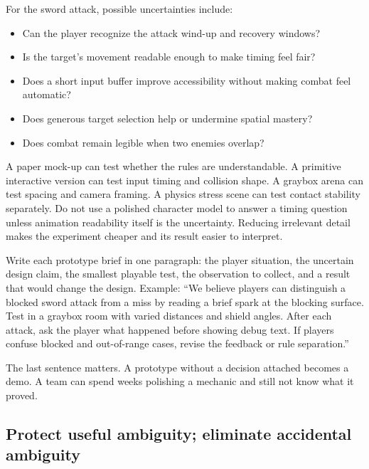 For the sword attack, possible uncertainties include:

\begin{itemize}
\tightlist
\item
  Can the player recognize the attack wind-up and recovery windows?
\item
  Is the target's movement readable enough to make timing feel fair?
\item
  Does a short input buffer improve accessibility without making combat feel automatic?
\item
  Does generous target selection help or undermine spatial mastery?
\item
  Does combat remain legible when two enemies overlap?
\end{itemize}

A paper mock-up can test whether the rules are understandable. A primitive interactive version can test input timing and collision shape. A graybox arena can test spacing and camera framing. A physics stress scene can test contact stability separately. Do not use a polished character model to answer a timing question unless animation readability itself is the uncertainty. Reducing irrelevant detail makes the experiment cheaper and its result easier to interpret.

Write each prototype brief in one paragraph: the player situation, the uncertain design claim, the smallest playable test, the observation to collect, and a result that would change the design. Example: ``We believe players can distinguish a blocked sword attack from a miss by reading a brief spark at the blocking surface. Test in a graybox room with varied distances and shield angles. After each attack, ask the player what happened before showing debug text. If players confuse blocked and out-of-range cases, revise the feedback or rule separation.''

The last sentence matters. A prototype without a decision attached becomes a demo. A team can spend weeks polishing a mechanic and still not know what it proved.

\subsection{Protect useful ambiguity; eliminate accidental ambiguity}\label{05-engine-i-ch009-protect-useful-ambiguity-eliminate-accidental-ambiguity}

\hypertarget{05-engine-i-ch009-protect-useful-ambiguity-eliminate-accidental-ambiguity}{}

